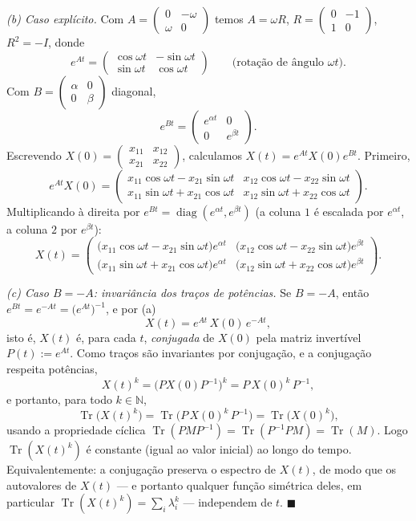 \emph{(b) Caso explícito.}
Com $A=\begin{pmatrix}0&-\omega\\ \omega&0\end{pmatrix}$ temos $A=\omega R$, $R=\begin{pmatrix}0&-1\\1&0\end{pmatrix}$, $R^2=-I$, donde
\[
    e^{At}=\begin{pmatrix}\cos\omega t&-\sin\omega t\\ \sin\omega t&\cos\omega t\end{pmatrix}
    \qquad\text{(rotação de ângulo }\omega t\text{).}
\]
Com $B=\begin{pmatrix}\alpha&0\\0&\beta\end{pmatrix}$ diagonal,
\[
    e^{Bt}=\begin{pmatrix}e^{\alpha t}&0\\0&e^{\beta t}\end{pmatrix}.
\]
Escrevendo $X(0)=\begin{pmatrix}x_{11}&x_{12}\\ x_{21}&x_{22}\end{pmatrix}$, calculamos $X(t)=e^{At}X(0)e^{Bt}$. Primeiro,
\[
    e^{At}X(0)
    =\begin{pmatrix}
        x_{11}\cos\omega t-x_{21}\sin\omega t & x_{12}\cos\omega t-x_{22}\sin\omega t\\[2pt]
        x_{11}\sin\omega t+x_{21}\cos\omega t & x_{12}\sin\omega t+x_{22}\cos\omega t
    \end{pmatrix}.
\]
Multiplicando à direita por $e^{Bt}=\operatorname{diag}(e^{\alpha t},e^{\beta t})$ (a coluna $1$ é escalada por $e^{\alpha t}$, a coluna $2$ por $e^{\beta t}$):
\[
    \boxed{\;
    X(t)=\begin{pmatrix}
        \big(x_{11}\cos\omega t-x_{21}\sin\omega t\big)e^{\alpha t}
        & \big(x_{12}\cos\omega t-x_{22}\sin\omega t\big)e^{\beta t}\\[4pt]
        \big(x_{11}\sin\omega t+x_{21}\cos\omega t\big)e^{\alpha t}
        & \big(x_{12}\sin\omega t+x_{22}\cos\omega t\big)e^{\beta t}
    \end{pmatrix}.
    \;}
\]

\emph{(c) Caso $B=-A$: invariância dos traços de potências.}
Se $B=-A$, então $e^{Bt}=e^{-At}=\big(e^{At}\big)^{-1}$, e por (a)
\[
    X(t)=e^{At}\,X(0)\,e^{-At},
\]
isto é, $X(t)$ é, para cada $t$, \emph{conjugada} de $X(0)$ pela matriz invertível $P(t):=e^{At}$. Como traços são invariantes por conjugação, e a conjugação respeita potências,
\[
    X(t)^k=\big(P X(0)P^{-1}\big)^k=P\,X(0)^k\,P^{-1},
\]
e portanto, para todo $k\in\mathbb{N}$,
\[
    \operatorname{Tr}\!\big(X(t)^k\big)
    =\operatorname{Tr}\!\big(P\,X(0)^k\,P^{-1}\big)
    =\operatorname{Tr}\!\big(X(0)^k\big),
\]
usando a propriedade cíclica $\operatorname{Tr}(PMP^{-1})=\operatorname{Tr}(P^{-1}PM)=\operatorname{Tr}(M)$. Logo $\operatorname{Tr}(X(t)^k)$ é constante (igual ao valor inicial) ao longo do tempo. Equivalentemente: a conjugação preserva o espectro de $X(t)$, de modo que os autovalores de $X(t)$ — e portanto qualquer função simétrica deles, em particular $\operatorname{Tr}(X(t)^k)=\sum_i \lambda_i^k$ — independem de $t$. \qquad$\blacksquare$

